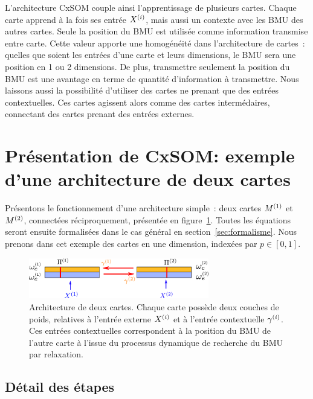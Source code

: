 \documentclass[../main]{subfiles}
\begin{document}
L'architecture CxSOM couple ainsi l'apprentissage de plusieurs cartes. Chaque carte apprend à la fois ses entrée $X^{({i})}$, mais aussi un contexte avec les BMU des autres cartes.
Seule la position du BMU est utilisée comme information transmise entre carte. Cette valeur apporte une homogénéité dans l'architecture de cartes~: quelles que soient les entrées d'une carte et leurs dimensions, le BMU sera une position en 1 ou 2 dimensions. De plus, transmettre seulement la position du BMU est une avantage en terme de quantité d'information à transmettre.
Nous laissons aussi la possibilité d'utiliser des cartes ne prenant que des entrées contextuelles. Ces cartes agissent alors comme des cartes intermédaires, connectant des cartes prenant des entrées externes.

\section{Présentation de CxSOM: exemple d'une architecture de deux cartes}

Présentons le fonctionnement d'une architecture simple~: deux cartes $M^{({1})}$ et $M^{({2})}$, connectées réciproquement, présentée en figure~\ref{fig:2som_archi}. Toutes les équations seront ensuite formalisées dans le cas général en section~\ref{sec:formalisme}. 
Nous prenons dans cet exemple des cartes en une dimension, indexées par $p \in [0,1]$.
\begin{figure}[ht]
    \centering
    \includegraphics[width=0.7\textwidth]{archi_2som}
    \caption{Architecture de deux cartes. Chaque carte possède deux couches de poids, relatives à l'entrée externe $X^{({i})}$ et à l'entrée contextuelle $\gamma^{({i})}$.
    Ces entrées contextuelles correspondent à la position du BMU de l'autre carte à l'issue du processus dynamique de recherche du BMU par relaxation.
    \label{fig:2som_archi}}
    \end{figure}
\subsection{Détail des étapes}
\end{document}
